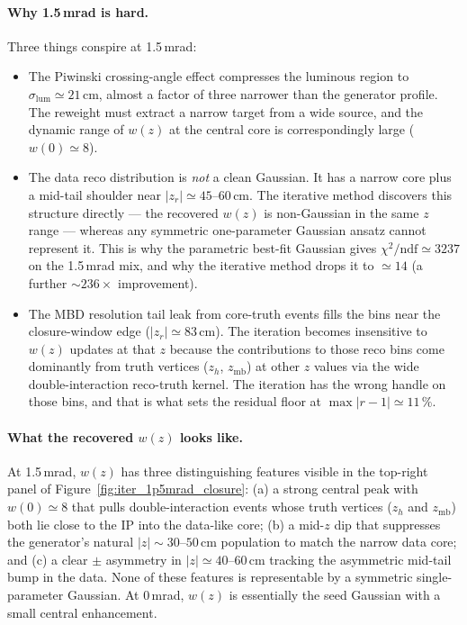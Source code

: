 \documentclass[11pt,a4paper]{article}
\begin{document}
\paragraph{Why 1.5\,mrad is hard.}
Three things conspire at 1.5\,mrad:
\begin{itemize}\setlength\itemsep{2pt}
\item The Piwinski crossing-angle effect compresses the luminous region
to $\sigma_\mathrm{lum}\!\simeq\!21$\,cm, almost a factor of three
narrower than the generator profile. The reweight must extract a
narrow target from a wide source, and the dynamic range of $w(z)$ at
the central core is correspondingly large ($w(0)\!\simeq\!8$).
\item The data reco distribution is \emph{not} a clean Gaussian. It
has a narrow core plus a mid-tail shoulder near
$|z_r|\!\simeq\!45$--$60$\,cm. The iterative method discovers this
structure directly --- the recovered $w(z)$ is non-Gaussian in the
same $z$ range --- whereas any symmetric one-parameter Gaussian ansatz
cannot represent it. This is why the parametric best-fit Gaussian
gives $\chi^2/\mathrm{ndf}\!\simeq\!3237$ on the 1.5\,mrad mix, and
why the iterative method drops it to $\simeq\!14$ (a further
$\sim\!236\times$ improvement).
\item The MBD resolution tail leak from core-truth events fills the
bins near the closure-window edge ($|z_r|\!\simeq\!83$\,cm). The
iteration becomes insensitive to $w(z)$ updates at that $z$ because
the contributions to those reco bins come dominantly from truth vertices
($z_h$, $z_\mathrm{mb}$) at other $z$ values via the wide
double-interaction reco-truth kernel.
The iteration has the wrong handle on those bins, and that is what
sets the residual floor at $\max|r-1|\!\simeq\!11\,\%$.
\end{itemize}

\paragraph{What the recovered $w(z)$ looks like.}
At 1.5\,mrad, $w(z)$ has three distinguishing features visible in the
top-right panel of Figure~\ref{fig:iter_1p5mrad_closure}:
(a) a strong central peak with $w(0)\!\simeq\!8$ that pulls
double-interaction events whose truth vertices ($z_h$ and
$z_\mathrm{mb}$) both lie close to the IP into the data-like core; (b) a mid-$z$ dip that suppresses the
generator's natural $|z|\!\sim\!30$--$50$\,cm population to match the
narrow data core; and (c) a clear $\pm$ asymmetry in
$|z|\!\simeq\!40$--$60$\,cm tracking the asymmetric mid-tail bump in
the data. None of these features is representable by a symmetric
single-parameter Gaussian. At 0\,mrad, $w(z)$ is essentially the seed
Gaussian with a small central enhancement.
\end{document}
